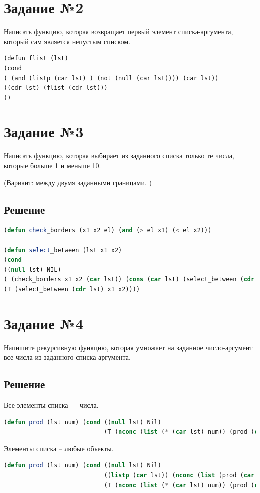 \documentclass[12pt]{report}
\begin{document}
\section*{Задание №2}
Написать функцию, которая возвращает первый элемент списка-аргумента, который сам
является непустым списком.

\begin{lstlisting}
(defun flist (lst)
(cond 
( (and (listp (car lst) ) (not (null (car lst)))) (car lst))
((cdr lst) (flist (cdr lst)))
)) 
\end{lstlisting}

\section*{Задание №3}
Написать функцию, которая выбирает из заданного списка только те числа, которые
больше 1 и меньше 10.

(Вариант: между двумя заданными границами. )
\subsection*{Решение}
\begin{lstlisting}[label=third,caption=Решение задания №3, language=lisp]
(defun check_borders (x1 x2 el) (and (> el x1) (< el x2)))

(defun select_between (lst x1 x2)
(cond
((null lst) NIL)
( (check_borders x1 x2 (car lst)) (cons (car lst) (select_between (cdr lst) x1 x2)) )
(T (select_between (cdr lst) x1 x2))))
\end{lstlisting}

\section*{Задание №4}
Напишите рекурсивную функцию, которая умножает на заданное число-аргумент все
числа из заданного списка-аргумента.

\subsection*{Решение}
Все элементы списка --- числа.
\begin{lstlisting}[label=third,caption=Решение задания №3, language=lisp]
(defun prod (lst num) (cond ((null lst) Nil)
						    (T (nconc (list (* (car lst) num)) (prod (cdr lst) num)))))
\end{lstlisting}

Элементы списка -- любые объекты.
\begin{lstlisting}[label=third,caption=Решение задания №3, language=lisp]
(defun prod (lst num) (cond ((null lst) Nil)
							((listp (car lst)) (nconc (list (prod (car lst) num)) (prod (cdr lst) num)))
						    (T (nconc (list (* (car lst) num)) (prod (cdr lst) num)))))
\end{lstlisting}
\end{document}
